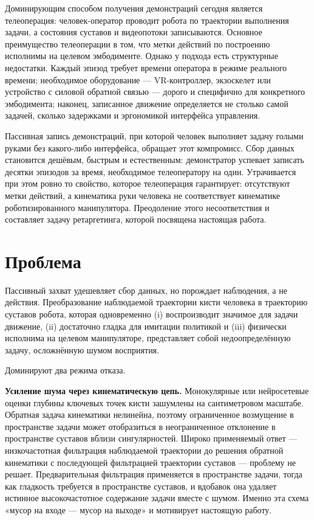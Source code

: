 \documentclass[12pt, a4paper, oneside]{report}
\begin{document}
Доминирующим способом получения демонстраций сегодня является телеоперация:
человек-оператор проводит робота по траектории выполнения задачи, а состояния
суставов и видеопотоки записываются. Основное преимущество телеоперации в том,
что метки действий по построению исполнимы на целевом эмбодименте. Однако у
подхода есть структурные недостатки. Каждый эпизод требует времени оператора в
режиме реального времени; необходимое оборудование --- VR-контроллер,
экзоскелет или устройство с силовой обратной связью --- дорого и специфично для
конкретного эмбодимента; наконец, записанное движение определяется не столько
самой задачей, сколько задержками и эргономикой интерфейса управления.

Пассивная запись демонстраций, при которой человек выполняет задачу голыми
руками без какого-либо интерфейса, обращает этот компромисс. Сбор данных
становится дешёвым, быстрым и естественным: демонстратор успевает записать
десятки эпизодов за время, необходимое телеоператору на один. Утрачивается при
этом ровно то свойство, которое телеоперация гарантирует: отсутствуют метки
действий, а кинематика руки человека не соответствует кинематике
роботизированного манипулятора. Преодоление этого несоответствия и составляет
задачу ретаргетинга, которой посвящена настоящая работа.

\section{Проблема}

Пассивный захват удешевляет сбор данных, но порождает наблюдения, а не действия.
Преобразование наблюдаемой траектории кисти человека в траекторию суставов
робота, которая одновременно (i) воспроизводит значимое для задачи движение,
(ii) достаточно гладка для имитации политикой и (iii) физически исполнима на
целевом манипуляторе, представляет собой недоопределённую задачу, осложнённую
шумом восприятия.

Доминируют два режима отказа.

\textbf{Усиление шума через кинематическую цепь.} Монокулярные или нейросетевые
оценки глубины ключевых точек кисти зашумлены на сантиметровом масштабе.
Обратная задача кинематики нелинейна, поэтому ограниченное возмущение в
пространстве задачи может отобразиться в неограниченное отклонение в
пространстве суставов вблизи сингулярностей. Широко применяемый ответ ---
низкочастотная фильтрация наблюдаемой траектории до решения обратной кинематики
с последующей фильтрацией траектории суставов --- проблему не решает.
Предварительная фильтрация применяется в пространстве задачи, тогда как
гладкость требуется в пространстве суставов, и вдобавок она удаляет истинное
высокочастотное содержание задачи вместе с шумом. Именно эта схема
«мусор на входе --- мусор на выходе» и мотивирует настоящую работу.
\end{document}
